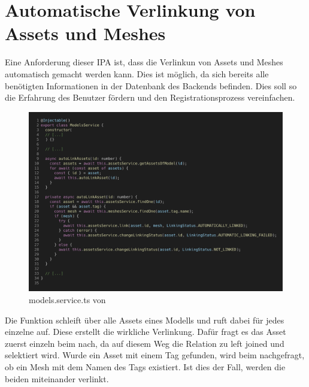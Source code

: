 \section{Automatische Verlinkung von Assets und Meshes}
Eine Anforderung dieser IPA ist, dass die Verlinkun von Assets und Meshes automatisch gemacht werden kann. Dies ist möglich, da sich bereits alle benötigten Informationen in der Datenbank des Backends befinden. Dies soll so die Erfahrung des Benutzer fördern und den Registrationsprozess vereinfachen.
\begin{figure}[H]
  \centering
  \includegraphics[width=.95\linewidth]{./images/models.service.ts.2.png}
  \caption[{models.service.ts von }]{models.service.ts von }
  \label{fig:settingsLayout}
\end{figure}
Die Funktion  schleift über alle Assets eines Modells und ruft dabei für jedes einzelne  auf. Diese erstellt die wirkliche Verlinkung. Dafür fragt es das Asset zuerst einzeln beim  nach, da auf diesem Weg die Relation zu  left joined und selektiert wird. Wurde ein Asset mit einem Tag gefunden, wird beim  nachgefragt, ob ein Mesh mit dem Namen des Tags existiert. Ist dies der Fall, werden die beiden miteinander verlinkt.
